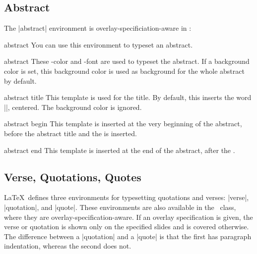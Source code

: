 \subsection{Abstract}

The |abstract| environment is overlay-specificiation-aware in \beamer:


\begin{environment}{{abstract}}
  You can use this environment to typeset an abstract.

  \begin{element}{abstract}\no\yes\yes
    These \beamer-color and -font are used to typeset the abstract. If
    a background color is set, this background color is used as
    background for the whole abstract by default.
  \end{element}

  \begin{element}{abstract title}\yes\yes\yes
    This template is used for the title. By default, this inserts
    the word |\abstractname|, centered. The background color is ignored.
  \end{element}

  \begin{element}{abstract begin}\yes\no\no
    This template is inserted at the very beginning of the abstract,
    before the abstract title and the  is inserted.
  \end{element}

  \begin{element}{abstract end}\yes\no\no
    This template is inserted at the end of the abstract, after the
    .
  \end{element}
\end{environment}




\subsection{Verse, Quotations, Quotes}

\LaTeX\ defines three environments for typesetting quotations and
verses: |verse|, |quotation|, and |quote|. These environments are also
available in the \beamer\ class, where they are
overlay-specification-aware. If an overlay specification is given, the
verse or quotation is shown only on the specified slides and is
covered otherwise. The difference between a |quotation| and a |quote|
is that the first has paragraph indentation, whereas the second does
not. 

